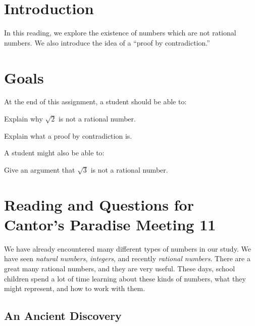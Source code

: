 \documentclass[12pt,letterpaper]{article}
\theoremstyle{definition}
\begin{document}
\setlength{\parskip}{1ex plus 0.5ex minus 0.2ex}
\setlength{\parindent}{0pt}

\pagestyle{fancy}
\cfoot{}

\section*{Introduction}
In this reading, we explore the existence of numbers which are not rational numbers.
We also introduce the idea of a ``proof by contradiction.''

\section*{Goals}
At the end of this assignment, a student should be able to:
\begin{compactitem}
\item Explain why $\sqrt{2}$ is not a rational number.
\item Explain what a proof by contradiction is.
\end{compactitem}
A student might also be able to:
\begin{compactitem}
\item Give an argument that $\sqrt{3}$ is not a rational number.
\end{compactitem}

\section*{Reading and Questions for Cantor's Paradise Meeting 11}

We have already encountered many different types of numbers in our study. 
We have seen \emph{natural numbers}, \emph{integers}, and recently \emph{rational numbers}.
There are a great many rational numbers, and they are very useful.
These days, school children spend a lot of time learning about these kinds of numbers, what they might represent, and how to work with them.

\subsection*{An Ancient Discovery}
\end{document}
